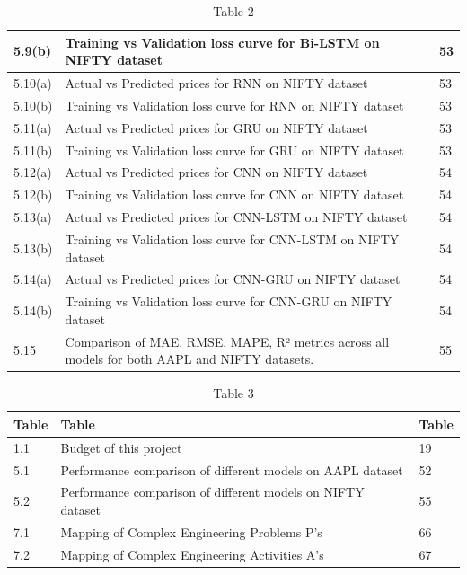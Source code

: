 \documentclass[12pt,a4paper]{report}
\begin{document}
\begin{table}[htbp]
\begin{tabular}{|l|l|l|}
\hline
5.9(b) & Training vs Validation loss curve for Bi-LSTM on NIFTY dataset & 53 \\
\hline
5.10(a) & Actual vs Predicted prices for RNN on NIFTY dataset & 53 \\
\hline
5.10(b) & Training vs Validation loss curve for RNN on NIFTY dataset & 53 \\
\hline
5.11(a) & Actual vs Predicted prices for GRU on NIFTY dataset & 53 \\
\hline
5.11(b) & Training vs Validation loss curve for GRU on NIFTY dataset & 53 \\
\hline
5.12(a) & Actual vs Predicted prices for CNN on NIFTY dataset & 54 \\
\hline
5.12(b) & Training vs Validation loss curve for CNN on NIFTY dataset & 54 \\
\hline
5.13(a) & Actual vs Predicted prices for CNN-LSTM on NIFTY dataset & 54 \\
\hline
5.13(b) & Training vs Validation loss curve for CNN-LSTM on NIFTY dataset & 54 \\
\hline
5.14(a) & Actual vs Predicted prices for CNN-GRU on NIFTY dataset & 54 \\
\hline
5.14(b) & Training vs Validation loss curve for CNN-GRU on NIFTY dataset & 54 \\
\hline
5.15 & Comparison of MAE, RMSE, MAPE, R² metrics across all models for both AAPL and NIFTY datasets. & 55 \\
\hline
\end{tabular}
\caption{Table 2}
\label{tab:table2}
\end{table}

\listoftables
\newpage

\begin{table}[htbp]
\centering
\begin{tabular}{|l|l|l|}
\hline
\textbf{Table} & \textbf{Table} & \textbf{Table} \\
\hline
1.1 & Budget of this project & 19 \\
\hline
5.1 & Performance comparison of different models on AAPL dataset & 52 \\
\hline
5.2 & Performance comparison of different models on NIFTY dataset & 55 \\
\hline
7.1 & Mapping of Complex Engineering Problems P’s & 66 \\
\hline
7.2 & Mapping of Complex Engineering Activities A’s & 67 \\
\hline
\end{tabular}
\caption{Table 3}
\label{tab:table3}
\end{table}
\end{document}
